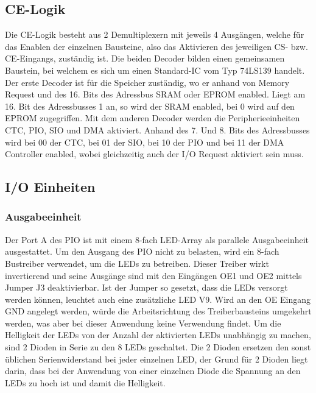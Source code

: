 \subsection{CE-Logik}
Die CE-Logik besteht aus 2 Demultiplexern mit jeweils 4 Ausgängen, welche für das Enablen der einzelnen Bausteine, also das Aktivieren des jeweiligen CS- bzw. CE-Eingangs, zuständig ist. Die beiden Decoder bilden einen gemeinsamen Baustein, bei welchem es sich um einen Standard-IC vom Typ 74LS139 handelt. Der erste Decoder ist für die Speicher zuständig, wo er anhand von Memory Request und des 16. Bits des Adressbus SRAM oder EPROM enabled. Liegt am 16. Bit des Adressbusses 1 an, so wird der SRAM enabled, bei 0 wird auf den EPROM zugegriffen. Mit dem anderen Decoder werden die Peripherieeinheiten CTC, PIO, SIO und DMA aktiviert. Anhand des 7. Und 8. Bits des Adressbusses wird bei 00 der CTC, bei 01 der SIO, bei 10 der PIO und bei 11 der DMA Controller enabled, wobei gleichzeitig auch der I/O Request aktiviert sein muss.

\subsection{I/O Einheiten}
\subsubsection{Ausgabeeinheit}
Der Port A des PIO ist mit einem 8-fach LED-Array als parallele Ausgabeeinheit ausgestattet. Um den Ausgang des PIO nicht zu belasten, wird ein 8-fach Bustreiber verwendet, um die LEDs zu betreiben. Dieser Treiber wirkt invertierend und seine Ausgänge sind mit den Eingängen OE1 und OE2 mittels Jumper J3 deaktivierbar. Ist der Jumper so gesetzt, dass die LEDs versorgt werden können, leuchtet auch eine zusätzliche LED V9. Wird an den OE Eingang GND angelegt werden, würde die Arbeitsrichtung des Treiberbausteins umgekehrt werden, was aber bei dieser Anwendung keine Verwendung findet. Um die Helligkeit der LEDs von der Anzahl der aktivierten LEDs unabhängig zu machen, sind 2 Dioden in Serie zu den 8 LEDs geschaltet. Die 2 Dioden ersetzen den sonst üblichen Serienwiderstand bei jeder einzelnen LED, der Grund für 2 Dioden liegt darin, dass bei der Anwendung von einer einzelnen Diode die Spannung an den LEDs zu hoch ist und damit die Helligkeit.

